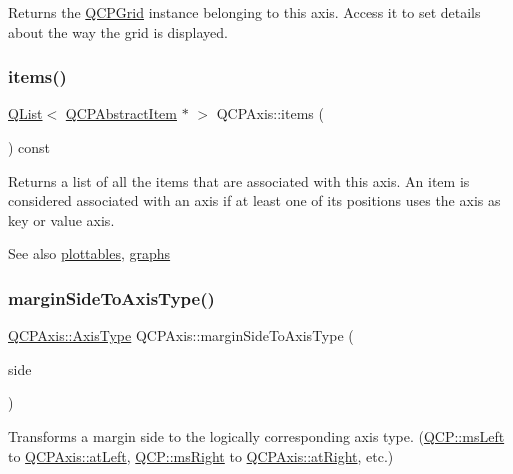 Returns the \hyperlink{class_q_c_p_grid}{Q\+C\+P\+Grid} instance belonging to this axis. Access it to set details about the way the grid is displayed. \mbox{\label{class_q_c_p_axis_a42761bc68e2f3a9f68549d45b73f705b}} 
\subsubsection{\texorpdfstring{items()}{items()}}
{\footnotesize\ttfamily \hyperlink{class_q_list}{Q\+List}$<$ \hyperlink{class_q_c_p_abstract_item}{Q\+C\+P\+Abstract\+Item} $\ast$ $>$ Q\+C\+P\+Axis\+::items (\begin{DoxyParamCaption}{ }\end{DoxyParamCaption}) const}

Returns a list of all the items that are associated with this axis. An item is considered associated with an axis if at least one of its positions uses the axis as key or value axis.

\begin{DoxySeeAlso}{See also}
\hyperlink{class_q_c_p_axis_ac5e0f6f65c75efb5fd32275d6e4ef0d6}{plottables}, \hyperlink{class_q_c_p_axis_ad590c0da223697a2727f97a520870fec}{graphs} 
\end{DoxySeeAlso}
\mbox{\label{class_q_c_p_axis_ac0a6b77bd52bec6c81cd62d167cfeba6}} 
\subsubsection{\texorpdfstring{margin\+Side\+To\+Axis\+Type()}{marginSideToAxisType()}}
{\footnotesize\ttfamily \hyperlink{class_q_c_p_axis_ae2bcc1728b382f10f064612b368bc18a}{Q\+C\+P\+Axis\+::\+Axis\+Type} Q\+C\+P\+Axis\+::margin\+Side\+To\+Axis\+Type (\begin{DoxyParamCaption}\item[{\hyperlink{namespace_q_c_p_a7e487e3e2ccb62ab7771065bab7cae54}{Q\+C\+P\+::\+Margin\+Side}}]{side }\end{DoxyParamCaption})\hspace{0.3cm}{\ttfamily [static]}}

Transforms a margin side to the logically corresponding axis type. (\hyperlink{namespace_q_c_p_a7e487e3e2ccb62ab7771065bab7cae54a9a47416a401c58f0c6219d17152757a9}{Q\+C\+P\+::ms\+Left} to \hyperlink{class_q_c_p_axis_ae2bcc1728b382f10f064612b368bc18aa8b78b9b79503778969f793bf03ab2fc6}{Q\+C\+P\+Axis\+::at\+Left}, \hyperlink{namespace_q_c_p_a7e487e3e2ccb62ab7771065bab7cae54a75c2181d12e8b8346e2e99e1beb4b694}{Q\+C\+P\+::ms\+Right} to \hyperlink{class_q_c_p_axis_ae2bcc1728b382f10f064612b368bc18aa2f0eb342b63c46c1388fc50fd7e9bcc5}{Q\+C\+P\+Axis\+::at\+Right}, etc.) \mbox{\label{class_q_c_p_axis_a18f3a68f2b691af1fd34b6593c886630}} 
